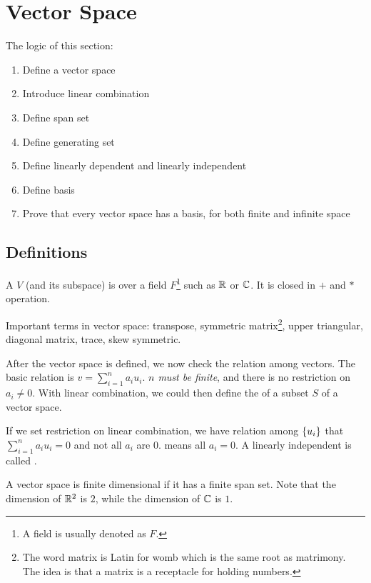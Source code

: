 \chapter{Vector Space}

The logic of this section:
\begin{enumerate}
    \item Define a vector space
    \item Introduce linear combination
    \item Define span set
    \item Define generating set
    \item Define linearly dependent and linearly independent
    \item Define basis
    \item Prove that every vector space has a basis, for both finite and infinite space
\end{enumerate}

\section{Definitions}

\begin{definition}
    A  $V$ (and its subspace) is over a field $F$\footnote{A field is usually denoted as $F$.} such as $\mathbb{R}$ or $\mathbb{C}$. It is closed in $+$ and $*$ operation.
\end{definition}


Important terms in vector space: transpose, symmetric matrix\footnote{The word matrix is Latin for womb which is the same root as matrimony. The idea is that a matrix is a receptacle for holding numbers.}, upper triangular, diagonal matrix, trace, skew symmetric.

After the vector space is defined, we now check the relation among vectors. The basic relation is  $v = \sum_{i=1}^{n} a_i u_i$. \emph{$n$ must be finite}, and there is no restriction on $a_i \neq 0$. With linear combination, we could then define the  of a subset $S$ of a vector space.

If we set restriction on linear combination, we have  relation among $\set{u_i}$ that $\sum_{i=1}^{n} a_i u_i = 0$ and not all $a_i$ are $0$.  means all $a_i = 0$. A linearly independent  is called .


A vector space is finite dimensional if it has a finite span set. Note that the dimension of $\mathbb{R}^2$ is $2$, while the dimension of $\mathbb{C}$ is $1$.


